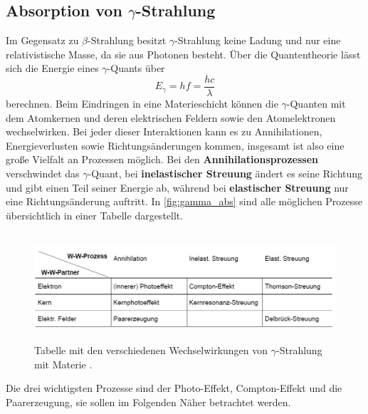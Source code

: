 \subsection{\texorpdfstring{Absorption von $\gamma$-Strahlung}{Absorption von Gamma-Strahlung}}

Im Gegensatz zu $\beta$-Strahlung besitzt $\gamma$-Strahlung keine Ladung und nur eine relativistische Masse,
da sie aus Photonen besteht. Über die Quantentheorie lässt sich die Energie eines $\gamma$-Quants über
\begin{equation*}
    E_\gamma = hf = \frac{hc}{\lambda}
\end{equation*}
berechnen.
Beim Eindringen in eine Materieschicht können die $\gamma$-Quanten mit dem Atomkernen und deren elektrischen Feldern
sowie den Atomelektronen wechselwirken.
Bei jeder dieser Interaktionen kann es zu Annihilationen, Energieverlusten sowie Richtungsänderungen kommen,
insgesamt ist also eine große Vielfalt an Prozessen möglich.
Bei den \textbf{Annihilationsprozessen} verschwindet das $\gamma$-Quant, bei \textbf{inelastischer Streuung}
ändert es seine Richtung und gibt einen Teil seiner Energie ab, während bei \textbf{elastischer Streuung} nur
eine Richtungsänderung auftritt.
In \autoref{fig:gamma_abs} sind alle möglichen Prozesse übersichtlich in einer Tabelle dargestellt.
\begin{figure}[H]
    \centering
    \includegraphics[height=4cm]{content/pics/gamma_absorption.jpg}
    \caption{Tabelle mit den verschiedenen Wechselwirkungen von $\gamma$-Strahlung mit Materie \cite{v704}.}
    \label{fig:gamma_abs}
\end{figure}
Die drei wichtigsten Prozesse sind der Photo-Effekt, Compton-Effekt und die Paarerzeugung, sie sollen im
Folgenden Näher betrachtet werden.
